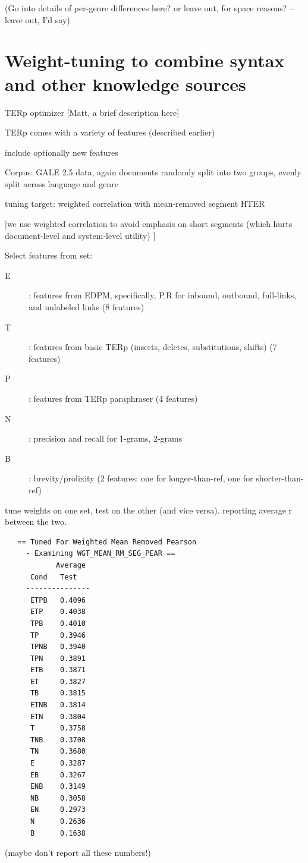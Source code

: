 \documentclass{kluwer}    %
\begin{document}
\begin{article}
  (Go into details of per-genre differences here? or leave out, for
  space reasons? -- leave out, I'd say)

\section{Weight-tuning to combine syntax and other knowledge sources}
\label{sec:hter2}

TERp optimizer [Matt, a brief description here]

TERp comes with a variety of features (described earlier)

include optionally new features

Corpus: GALE 2.5 data, again documents randomly split into two groups,
evenly split across language and genre

tuning target: weighted correlation with mean-removed segment HTER

[we use weighted correlation to avoid emphasis on short segments
(which hurts document-level and system-level utility) ]

Select features from set:

\begin{description}
\item[E]: features from EDPM, specifically, P,R for inbound, outbound,
  full-links, and unlabeled links  (8 features)
\item[T]: features from basic TERp
  (inserts, deletes, substitutions, shifts)  (7 features)
\item[P]: features from TERp paraphraser
  (4 features)
\item[N]: precision and recall for 1-grams, 2-grams
\item[B]: brevity/prolixity (2 features: one for longer-than-ref, one for
  shorter-than-ref)
\end{description}

tune weights on one set, test on the other (and vice versa).
reporting average r between the two.

\begin{verbatim}
   == Tuned For Weighted Mean Removed Pearson
     - Examining WGT_MEAN_RM_SEG_PEAR ==
            Average
      Cond   Test  
     ---------------
      ETPB   0.4096
      ETP    0.4038
      TPB    0.4010
      TP     0.3946
      TPNB   0.3940
      TPN    0.3891
      ETB    0.3871
      ET     0.3827
      TB     0.3815
      ETNB   0.3814
      ETN    0.3804
      T      0.3758
      TNB    0.3708
      TN     0.3680
      E      0.3287
      EB     0.3267
      ENB    0.3149
      NB     0.3058
      EN     0.2973
      N      0.2636
      B      0.1638
\end{verbatim}
(maybe don't report all these numbers!)
  

\end{article}
\end{document}
